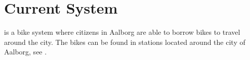 \section{Current System}


\bycykel is a bike system where citizens in Aalborg are able to borrow bikes to travel around the city.
The bikes can be found in stations located around the city of Aalborg, see .
